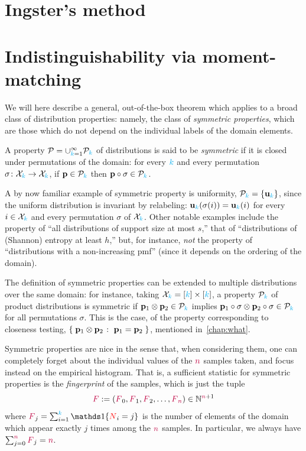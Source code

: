 
\section{Ingster's method}
\section{Indistinguishability via moment-matching}
\label{ssec:momentmatching}
We will here describe a general, out-of-the-box theorem which applies to a broad class of distribution properties: namely, the class of \emph{symmetric properties}, which are those which do not depend on the individual labels of the domain elements.
\begin{definition}
	A property $\mathcal{P}=\cup_{{\textcolor{cyan}{k}}=1}^\infty \mathcal{P}_{\textcolor{cyan}{k}}$ of distributions is said to be \emph{symmetric} if it is closed under permutations of the domain: for every ${\textcolor{cyan}{k}}$ and every permutation $\sigma\colon\mathcal{X}_{\textcolor{cyan}{k}}\to \mathcal{X}_{\textcolor{cyan}{k}}$, if $\mathbf{p}\in\mathcal{P}_{\textcolor{cyan}{k}}$ then $\mathbf{p}\circ\sigma\in\mathcal{P}_{\textcolor{cyan}{k}}$.
\end{definition}
A by now familiar example of symmetric property is uniformity, $\mathcal{P}_{\textcolor{cyan}{k}} =\{\mathbf{u}_{ {\textcolor{cyan}{k}} } \}$, since the uniform distribution is invariant by relabeling: $\mathbf{u}_{ {\textcolor{cyan}{k}} } (\sigma(i))=\mathbf{u}_{ {\textcolor{cyan}{k}} } (i)$ for every $i\in\mathcal{X}_{\textcolor{cyan}{k}}$ and every permutation $\sigma$ of $\mathcal{X}_{\textcolor{cyan}{k}}$. Other notable examples include the property of ``all distributions of support size at most $s$,'' that of ``distributions of (Shannon) entropy at least $h$,'' but, for instance, \emph{not} the property of ``distributions with a non-increasing pmf'' (since it depends on the ordering of the domain).

The definition of symmetric properties can be extended to multiple distributions over the same domain: for instance, taking $\mathcal{X}_{\textcolor{cyan}{k}}=[{\textcolor{cyan}{k}}]\times[{\textcolor{cyan}{k}}]$, a property $\mathcal{P}_{\textcolor{cyan}{k}}$ of product distributions is symmetric if $\mathbf{p}_1\otimes \mathbf{p}_2\in \mathcal{P}_{\textcolor{cyan}{k}}$ implies $\mathbf{p}_1\circ\sigma\otimes \mathbf{p}_2\circ\sigma\in \mathcal{P}_{\textcolor{cyan}{k}}$ for all permutations $\sigma$. This is the case, \eg of the property corresponding to {closeness testing}, $\setOfSuchThat{\p_1\otimes\p_2}{\p_1=\p_2}$, mentioned in~\cref{chap:what}.

Symmetric properties are nice in the sense that, when considering them, one can completely forget about the individual values of the ${\textcolor{purple}{n}}$ samples taken, and focus instead on the empirical histogram. That is, a sufficient statistic for symmetric properties is the \emph{fingerprint} of the samples, which is just the tuple
\[
	\textcolor{purple}{F}:= (\textcolor{purple}{F}_{0},\textcolor{purple}{F}_{1},\textcolor{purple}{F}_{2},\dots,\textcolor{purple}{F}_{{\textcolor{purple}{n}}}) \in \mathbb{N}^{{\textcolor{purple}{n}}+1}
\]
where $\freq_{j} = \sum_{i=1}^\ab \indic{\occur_{i}=j}$ is the number of elements of the domain which appear exactly $j$ times among the ${\textcolor{purple}{n}}$ samples. In particular, we always have $\sum_{j=0}^{\textcolor{purple}{n}} \textcolor{purple}{F}_j = {\textcolor{purple}{n}}$.\medskip

